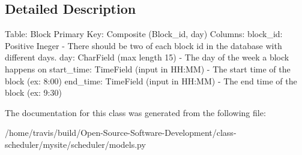 \subsection{Detailed Description}
\begin{DoxyVerb}    Table: Block
    Primary Key: Composite (Block_id, day)
    Columns:
        block_id: Positive Ineger
            - There should be two of each block id in the database with different days.
        day: CharField (max length 15)
            - The day of the week a block happens on
        start_time: TimeField (input in HH:MM)
            - The start time of the block (ex: 8:00)
        end_time: TimeField (input in HH:MM) 
            - The end time of the block (ex: 9:30)
\end{DoxyVerb}
 

The documentation for this class was generated from the following file\-:\begin{DoxyCompactItemize}
\item 
/home/travis/build/\-Open-\/\-Source-\/\-Software-\/\-Development/class-\/scheduler/mysite/scheduler/models.\-py\end{DoxyCompactItemize}
